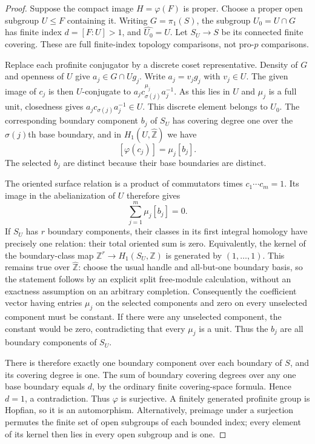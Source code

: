 \begin{proof}
Suppose the compact image $H=\varphi(F)$ is proper. Choose a proper open subgroup $U\leq F$ containing it. Writing $G=\pi_1(S)$, the subgroup $U_0=U\cap G$ has finite index $d=[F:U]>1$, and $\widehat{U_0}=U$. Let $S_U\to S$ be its connected finite covering. These are full finite-index topology comparisons, not pro-$p$ comparisons.

Replace each profinite conjugator by a discrete coset representative. Density of $G$ and openness of $U$ give $a_j\in G\cap Ug_j$. Write $a_j=v_jg_j$ with $v_j\in U$. The given image of $c_j$ is then $U$-conjugate to $a_j c_{\sigma(j)}^{\mu_j}a_j^{-1}$. As this lies in $U$ and $\mu_j$ is a full unit, closedness gives $a_j c_{\sigma(j)}a_j^{-1}\in U$. This discrete element belongs to $U_0$. The corresponding boundary component $b_j$ of $S_U$ has covering degree one over the $\sigma(j)$th base boundary, and in $H_1(U,\widehat{\mathbb Z})$ we have
\[
                       [\varphi(c_j)]=\mu_j[b_j].
\]
The selected $b_j$ are distinct because their base boundaries are distinct.

The oriented surface relation is a product of commutators times $c_1\cdots c_m=1$. Its image in the abelianization of $U$ therefore gives
\[
                         \sum_{j=1}^m\mu_j[b_j]=0.
\]
If $S_U$ has $r$ boundary components, their classes in its first integral homology have precisely one relation: their total oriented sum is zero. Equivalently, the kernel of the boundary-class map $\mathbb Z^r\to H_1(S_U,\mathbb Z)$ is generated by $(1,\ldots,1)$. This remains true over $\widehat{\mathbb Z}$: choose the usual handle and all-but-one boundary basis, so the statement follows by an explicit split free-module calculation, without an exactness assumption on an arbitrary completion. Consequently the coefficient vector having entries $\mu_j$ on the selected components and zero on every unselected component must be constant. If there were any unselected component, the constant would be zero, contradicting that every $\mu_j$ is a unit. Thus the $b_j$ are all boundary components of $S_U$.

There is therefore exactly one boundary component over each boundary of $S$, and its covering degree is one. The sum of boundary covering degrees over any one base boundary equals $d$, by the ordinary finite covering-space formula. Hence $d=1$, a contradiction. Thus $\varphi$ is surjective. A finitely generated profinite group is Hopfian, so it is an automorphism. Alternatively, preimage under a surjection permutes the finite set of open subgroups of each bounded index; every element of its kernel then lies in every open subgroup and is one.


\end{proof}

